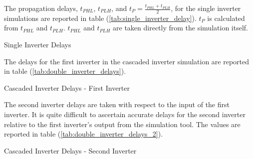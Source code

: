\FloatBarrier

The propagation delays, $t_{PHL}$, $t_{PLH}$, and $t_{P} = \frac{ t_{PHL} + t_{PLH} }{2}$, for the single inverter simulations are reported in table (\ref{tab:single_inverter_delay}).
$t_{P}$ is calculated from $t_{PHL}$ and $t_{PLH}$.
$t_{PHL}$ and $t_{PLH}$ are taken directly from the simulation itself.

\FloatBarrier

\begin{table}[h!]
	\centering
	\caption{Single Inverter Delays}
	\label{tab:single_inverter_delay}
\end{table}

\FloatBarrier

The delays for the first inverter in the cascaded inverter simulation are reported in table (\ref{tab:double_inverter_delays}).

\FloatBarrier

\begin{table}[h!]
	\centering
	\caption{Cascaded Inverter Delays - First Inverter}
	\label{tab:double_inverter_delays}
\end{table}

\FloatBarrier

The second inverter delays are taken with respect to the input of the first inverter.
It is quite difficult to ascertain accurate delays for the second inverter relative to the first inverter's output from the simulation tool.
The values are reported in table (\ref{tab:double_inverter_delays_2}).

\FloatBarrier

\begin{table}[h!]
	\centering
	\caption{Cascaded Inverter Delays - Second Inverter}
	\label{tab:double_inverter_delays_2}
\end{table}

\FloatBarrier

